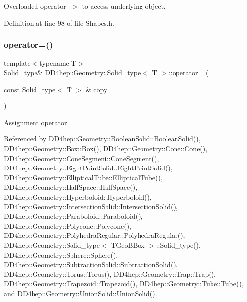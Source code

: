 Overloaded operator -\/$>$ to access underlying object. 



Definition at line 98 of file Shapes.\+h.

\hypertarget{class_d_d4hep_1_1_geometry_1_1_solid__type_a184c61e7d41ab0a178100d4b088306fc}{}\label{class_d_d4hep_1_1_geometry_1_1_solid__type_a184c61e7d41ab0a178100d4b088306fc} 
\subsubsection{\texorpdfstring{operator=()}{operator=()}}
{\footnotesize\ttfamily template$<$typename T$>$ \\
\hyperlink{class_d_d4hep_1_1_geometry_1_1_solid__type}{Solid\+\_\+type}\& \hyperlink{class_d_d4hep_1_1_geometry_1_1_solid__type}{D\+D4hep\+::\+Geometry\+::\+Solid\+\_\+type}$<$ \hyperlink{class_t}{T} $>$\+::operator= (\begin{DoxyParamCaption}\item[{const \hyperlink{class_d_d4hep_1_1_geometry_1_1_solid__type}{Solid\+\_\+type}$<$ \hyperlink{class_t}{T} $>$ \&}]{copy }\end{DoxyParamCaption})\hspace{0.3cm}{\ttfamily [default]}}



Assignment operator. 



Referenced by D\+D4hep\+::\+Geometry\+::\+Boolean\+Solid\+::\+Boolean\+Solid(), D\+D4hep\+::\+Geometry\+::\+Box\+::\+Box(), D\+D4hep\+::\+Geometry\+::\+Cone\+::\+Cone(), D\+D4hep\+::\+Geometry\+::\+Cone\+Segment\+::\+Cone\+Segment(), D\+D4hep\+::\+Geometry\+::\+Eight\+Point\+Solid\+::\+Eight\+Point\+Solid(), D\+D4hep\+::\+Geometry\+::\+Elliptical\+Tube\+::\+Elliptical\+Tube(), D\+D4hep\+::\+Geometry\+::\+Half\+Space\+::\+Half\+Space(), D\+D4hep\+::\+Geometry\+::\+Hyperboloid\+::\+Hyperboloid(), D\+D4hep\+::\+Geometry\+::\+Intersection\+Solid\+::\+Intersection\+Solid(), D\+D4hep\+::\+Geometry\+::\+Paraboloid\+::\+Paraboloid(), D\+D4hep\+::\+Geometry\+::\+Polycone\+::\+Polycone(), D\+D4hep\+::\+Geometry\+::\+Polyhedra\+Regular\+::\+Polyhedra\+Regular(), D\+D4hep\+::\+Geometry\+::\+Solid\+\_\+type$<$ T\+Geo\+B\+Box $>$\+::\+Solid\+\_\+type(), D\+D4hep\+::\+Geometry\+::\+Sphere\+::\+Sphere(), D\+D4hep\+::\+Geometry\+::\+Subtraction\+Solid\+::\+Subtraction\+Solid(), D\+D4hep\+::\+Geometry\+::\+Torus\+::\+Torus(), D\+D4hep\+::\+Geometry\+::\+Trap\+::\+Trap(), D\+D4hep\+::\+Geometry\+::\+Trapezoid\+::\+Trapezoid(), D\+D4hep\+::\+Geometry\+::\+Tube\+::\+Tube(), and D\+D4hep\+::\+Geometry\+::\+Union\+Solid\+::\+Union\+Solid().

